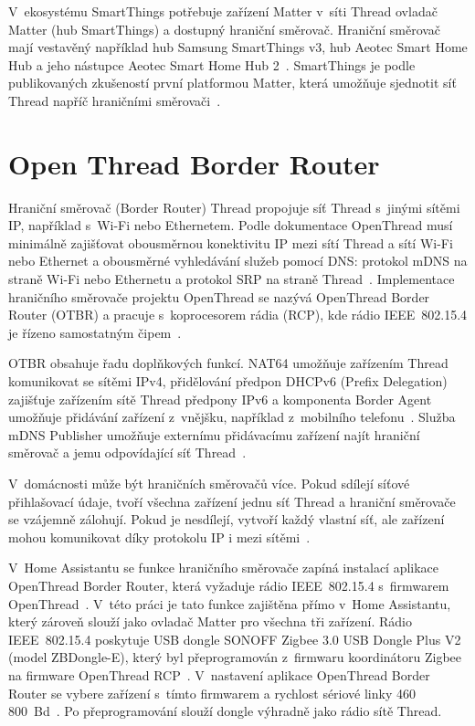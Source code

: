 V~ekosystému SmartThings potřebuje zařízení Matter v~síti Thread ovladač
Matter (hub SmartThings) a dostupný hraniční směrovač. Hraniční směrovač
mají vestavěný například hub Samsung SmartThings v3, hub Aeotec Smart
Home Hub a jeho nástupce Aeotec Smart Home Hub 2~\cite{smartthings-thread}.
SmartThings je podle publikovaných zkušeností první platformou Matter,
která umožňuje sjednotit síť Thread napříč hraničními
směrovači~\cite{smartthings-thread}. 

\section{Open Thread Border Router}
\label{sec:otbr}

Hraniční směrovač (Border Router) Thread propojuje síť Thread s~jinými
sítěmi IP, například s~Wi-Fi nebo Ethernetem. Podle dokumentace
OpenThread musí minimálně zajišťovat obousměrnou konektivitu IP mezi sítí
Thread a sítí Wi-Fi nebo Ethernet a obousměrné vyhledávání služeb pomocí
DNS: protokol mDNS na straně Wi-Fi nebo Ethernetu a protokol SRP na straně
Thread~\cite{openthread-border-router}. Implementace hraničního směrovače
projektu OpenThread se nazývá OpenThread Border Router (OTBR) a pracuje
s~koprocesorem rádia (RCP), kde rádio IEEE~802.15.4 je řízeno samostatným
čipem~\cite{openthread-border-router}.

OTBR obsahuje řadu doplňkových funkcí. NAT64 umožňuje zařízením Thread
komunikovat se sítěmi IPv4, přidělování předpon DHCPv6 (Prefix Delegation)
zajišťuje zařízením sítě Thread předpony IPv6 a komponenta Border Agent umožňuje
přidávání zařízení z~vnějšku, například z~mobilního telefonu~\cite{openthread-border-router}.
Služba mDNS Publisher umožňuje externímu přidávacímu zařízení najít hraniční
směrovač a jemu odpovídající síť Thread~\cite{openthread-border-router}.

V~domácnosti může být hraničních směrovačů více. Pokud sdílejí síťové
přihlašovací údaje, tvoří všechna zařízení jednu síť Thread a hraniční směrovače
se vzájemně zálohují. Pokud je nesdílejí, vytvoří každý vlastní síť, ale zařízení
mohou komunikovat díky protokolu IP i mezi sítěmi~\cite{threadgroup-multiple-networks}.

V~Home Assistantu se funkce hraničního směrovače zapíná instalací aplikace
OpenThread Border Router, která vyžaduje rádio IEEE~802.15.4 s~firmwarem
OpenThread~\cite{ha-thread}. V~této práci je tato funkce zajištěna přímo
v~Home Assistantu, který zároveň slouží jako ovladač Matter pro všechna tři
zařízení. Rádio IEEE~802.15.4 poskytuje USB dongle SONOFF Zigbee 3.0 USB
Dongle Plus V2 (model ZBDongle-E), který byl přeprogramován z~firmwaru
koordinátoru Zigbee na firmware OpenThread RCP~\cite{sonoff-dongle}.
V~nastavení aplikace OpenThread Border Router se vybere zařízení s~tímto
firmwarem a rychlost sériové linky 460\,800~Bd~\cite{sonoff-thread-ha}.
Po přeprogramování slouží dongle výhradně jako rádio sítě Thread.


